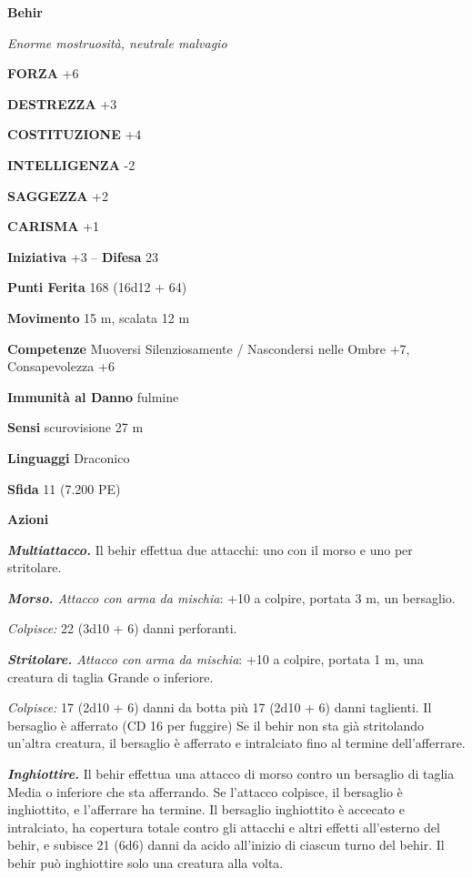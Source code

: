 \begin{multicols}{2}
\medskip{}\textbf{Behir}

\emph{Enorme mostruosità, neutrale malvagio}

\textbf{FORZA} +6

\textbf{DESTREZZA} +3

\textbf{COSTITUZIONE} +4

\textbf{INTELLIGENZA} -2

\textbf{SAGGEZZA} +2

\textbf{CARISMA} +1

\textbf{Iniziativa} +3 -- \textbf{Difesa} 23

\textbf{Punti Ferita} 168 (16d12 + 64)

\textbf{Movimento} 15 m, scalata 12 m

\textbf{Competenze} Muoversi Silenziosamente / Nascondersi nelle Ombre +7, Consapevolezza +6

\textbf{Immunità al Danno} fulmine

\textbf{Sensi} scurovisione 27 m

\textbf{Linguaggi} Draconico

\textbf{Sfida} 11 (7.200 PE)

\textbf{Azioni}

\emph{\textbf{Multiattacco.}} Il behir effettua due attacchi: uno con il morso e uno per stritolare.

\emph{\textbf{Morso.} Attacco con arma da mischia}: +10 a colpire, portata 3 m, un bersaglio.

\emph{Colpisce:} 22 (3d10 + 6) danni perforanti.

\emph{\textbf{Stritolare.} Attacco con arma da mischia}: +10 a colpire, portata 1 m, una creatura di taglia Grande o inferiore.

\emph{Colpisce:} 17 (2d10 + 6) danni da botta più 17 (2d10 + 6) danni taglienti. Il bersaglio è afferrato (CD 16 per fuggire) Se il behir non sta già stritolando un'altra creatura, il bersaglio è afferrato e intralciato fino al termine dell'afferrare.

\emph{\textbf{Inghiottire.}} Il behir effettua una attacco di morso contro un bersaglio di taglia Media o inferiore che sta afferrando. Se l'attacco colpisce, il bersaglio è inghiottito, e l'afferrare ha termine. Il bersaglio inghiottito è accecato e intralciato, ha copertura totale contro gli attacchi e altri effetti all'esterno del behir, e subisce 21 (6d6) danni da acido all'inizio di ciascun turno del behir. Il behir può inghiottire solo una creatura alla volta.


\end{multicols}

